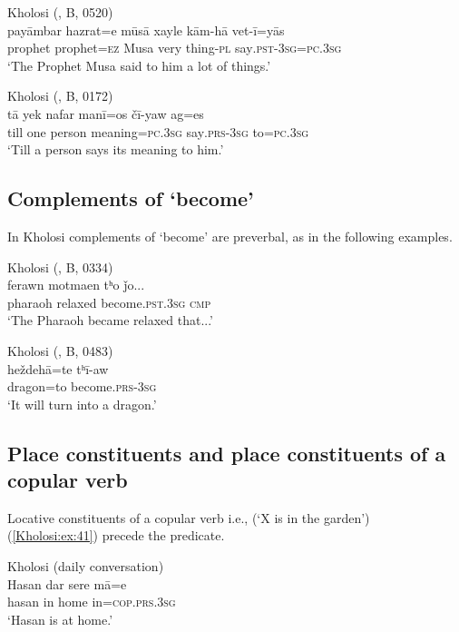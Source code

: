 \documentclass[output=paper,colorlinks,citecolor=brown]{langscibook}
\begin{document}
\ea\label{Kholosi:ex:37}
Kholosi (\citealt{nourzaei_kholosi_2022}, B, 0520)\\
\gll payāmbar hazrat=e mūsā xayle kām-hā vet-ī=yās \\
prophet prophet\textsc{=ez} {M}usa very thing\textsc{-pl} say\textsc{.pst-3sg=pc.3sg} \\
\glt `The Prophet Musa said to him a lot of things.' 
\z

\ea\label{Kholosi:ex:38}
Kholosi (\citealt{nourzaei_kholosi_2022}, B, 0172)\\
\gll tā yek nafar manī=os čī-yaw ag=es \\
till one person meaning\textsc{=pc.3sg} say\textsc{.prs-3sg} to\textsc{=pc.3sg} \\
\glt `Till a person says its meaning to him.' 
\z

\subsection{Complements of `become'}\label{Kholosi:ss:4.6}

In Kholosi complements of `become' are preverbal, as in the following examples.



\ea\label{Kholosi:ex:39}
Kholosi (\citealt{nourzaei_kholosi_2022}, B, 0334)\\
\gll ferawn motmaen tʰo ǰo... \\
pharaoh relaxed become\textsc{.pst.3sg} \textsc{cmp} \\
\glt `The Pharaoh became relaxed that...' 
\z

\ea\label{Kholosi:ex:40}
Kholosi (\citealt{nourzaei_kholosi_2022}, B, 0483)\\
\gll heždehā=te tʰī-aw \\
dragon=to become\textsc{.prs-3sg} \\
\glt `It will turn into a dragon.' 
\z

\subsection{Place constituents and place constituents of a copular verb}\label{Kholosi:ss:4.7}

Locative constituents of a copular verb i.e., (`X is in the garden') (\ref{Kholosi:ex:41}) precede the predicate.

\ea\label{Kholosi:ex:41}
Kholosi (daily conversation)\\
\gll Hasan dar sere mā=e \\
hasan in home in\textsc{=cop.prs.3sg} \\
\glt `Hasan is at home.' 
\z
\end{document}
